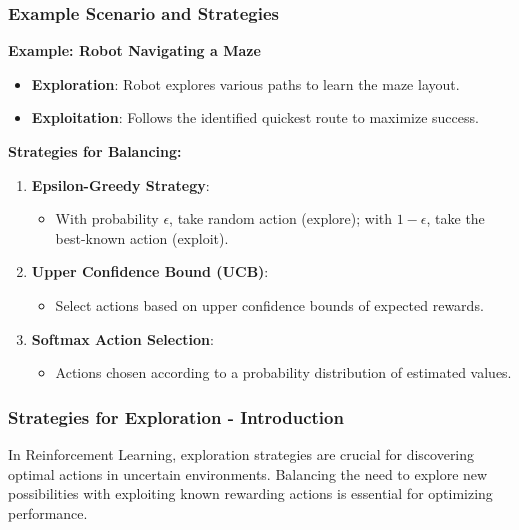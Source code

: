 \documentclass[aspectratio=169]{beamer}
\begin{document}
\begin{frame}[fragile]
    \frametitle{Example Scenario and Strategies}
    \textbf{Example: Robot Navigating a Maze}
    \begin{itemize}
        \item \textbf{Exploration}: Robot explores various paths to learn the maze layout.
        \item \textbf{Exploitation}: Follows the identified quickest route to maximize success.
    \end{itemize}
    
    \textbf{Strategies for Balancing:}
    \begin{enumerate}
        \item \textbf{Epsilon-Greedy Strategy}:
            \begin{itemize}
                \item With probability $\epsilon$, take random action (explore); with $1 - \epsilon$, take the best-known action (exploit).
            \end{itemize}
        \item \textbf{Upper Confidence Bound (UCB)}:
            \begin{itemize}
                \item Select actions based on upper confidence bounds of expected rewards.
            \end{itemize}
        \item \textbf{Softmax Action Selection}:
            \begin{itemize}
                \item Actions chosen according to a probability distribution of estimated values.
            \end{itemize}
    \end{enumerate}
\end{frame}

\begin{frame}[fragile]
    \frametitle{Strategies for Exploration - Introduction}
    In Reinforcement Learning, exploration strategies are crucial for discovering optimal actions in uncertain environments. 
    Balancing the need to explore new possibilities with exploiting known rewarding actions is essential for optimizing performance.
\end{frame}
\end{document}
